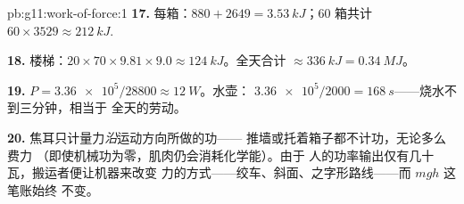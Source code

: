 \begin{solution}{pb:g11:work-of-force:1}
\textbf{17.} 每箱：$880 + 2649 = \qty{3.53}{kJ}$；$60$ 箱共计
$60 \times 3529 \approx \qty{212}{kJ}$.

\textbf{18.} 楼梯：$20 \times 70 \times 9.81 \times 9.0 \approx
\qty{124}{kJ}$。全天合计 $\approx \qty{336}{kJ} = \qty{0.34}{MJ}$。

\textbf{19.} $P = \num{3.36e5}/28800 \approx \qty{12}{W}$。水壶：
$\num{3.36e5}/2000 = \qty{168}{s}$——烧水不到三分钟，相当于
全天的劳动。

\textbf{20.} 焦耳只计量力\emph{沿}运动方向所做的功——
推墙或托着箱子都不计功，无论多么费力
（即使机械功为零，肌肉仍会消耗化学能）。由于
人的功率输出仅有几十瓦，搬运者便让机器来改变
力的方式——绞车、斜面、之字形路线——而 $mgh$ 这笔账始终
不变。
\end{solution}
